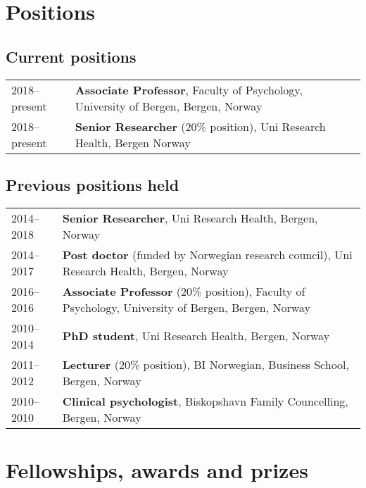 \documentclass[11pt,a4paper,a4paper]{article}
\begin{document}
\hypertarget{positions}{%
\section{Positions}\label{positions}}

\hypertarget{current-positions}{%
\subsection{Current positions}\label{current-positions}}

\begin{tabular}{ll}
  2018--present & \textbf{Associate Professor}, Faculty of Psychology, University of Bergen, Bergen, Norway \\ 
  2018--present & \textbf{Senior Researcher} (20\% position), Uni Research Health, Bergen Norway \\ 
  \end{tabular}

\hypertarget{previous-positions-held}{%
\subsection{Previous positions held}\label{previous-positions-held}}

\begin{tabular}{ll}
  2014--2018 & \textbf{Senior Researcher}, Uni Research Health, Bergen, Norway \\ 
  2014--2017 & \textbf{Post doctor} (funded by Norwegian research council), Uni Research Health, Bergen, Norway \\ 
  2016--2016 & \textbf{Associate Professor}  (20\% position), Faculty of Psychology, University of Bergen, Bergen, Norway \\ 
  2010--2014 & \textbf{PhD student}, Uni Research Health, Bergen, Norway \\ 
  2011--2012 & \textbf{Lecturer} (20\% position), BI Norwegian, Business School, Bergen, Norway \\ 
  2010--2010 & \textbf{Clinical psychologist}, Biskopshavn Family Councelling, Bergen, Norway \\ 
  \end{tabular}

\hypertarget{fellowships-awards-and-prizes}{%
\section{Fellowships, awards and prizes}\label{fellowships-awards-and-prizes}}
\end{document}

